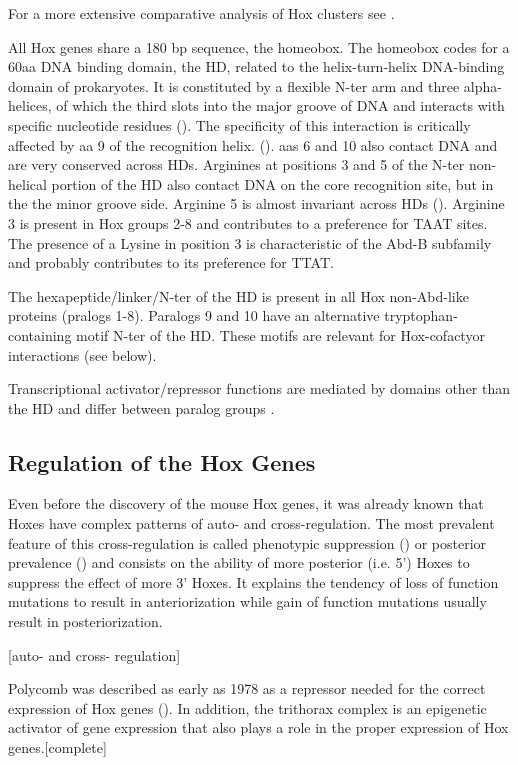 For a more extensive comparative analysis of Hox clusters see \cite{Duboule2007}.

All Hox genes share a 180 bp sequence, the homeobox. The homeobox codes for a 60aa DNA binding domain, the \ac{HD}, related to the helix-turn-helix DNA-binding domain of prokaryotes. It is constituted by a flexible \ac{N-ter} arm and three alpha-helices, of which the third slots into the major groove of DNA and interacts with specific nucleotide residues (\cite{Treisman1992}). The specificity of this interaction is critically affected by \ac{aa} 9 of the recognition helix. (\cite{Treisman1992}). \acp{aa} 6 and 10 also contact DNA and are very conserved across \acp{HD}. Arginines at positions 3 and 5 of the \ac{N-ter} non-helical portion of the \ac{HD} also contact DNA on the core recognition site, but in the the minor groove side. Arginine 5 is almost invariant across \acp{HD} (\cite{Treisman1992}). Arginine 3 is present in Hox groups 2-8 and contributes to a preference for TAAT sites. The presence of a Lysine in position 3 is characteristic of the \ac{Abd-B} subfamily and probably contributes to its preference for TTAT.

The hexapeptide/linker/\ac{N-ter} of the \ac{HD} is present in all Hox non-Abd-like proteins (pralogs 1-8). Paralogs 9 and 10 have an alternative tryptophan-containing motif \ac{N-ter} of the \ac{HD}. These motifs are relevant for Hox-cofactyor interactions (see below).

Transcriptional activator/repressor functions are mediated by domains other than the \ac{HD} and differ between paralog groups \cite{ref}.

\subsection{Regulation of the Hox Genes}

Even before the discovery of the mouse Hox genes, it was already known that Hoxes have complex patterns of auto- and cross-regulation. The most prevalent feature of this cross-regulation is called phenotypic suppression (\cite{Gonzalez-Reyes1990}) or posterior prevalence (\cite{Lufkin1991}) and consists on the ability of more posterior (i.e. 5') Hoxes to suppress the effect of more 3' Hoxes. It explains the tendency of loss of function mutations to result in anteriorization while gain of function mutations usually result in posteriorization.

[auto- and cross- regulation]

Polycomb was described as early as 1978 as a repressor needed for the correct expression of Hox genes (\cite{Lewis1978}). In addition, the trithorax complex is an epigenetic activator of gene expression that also plays a role in the proper expression of Hox genes.[complete]

